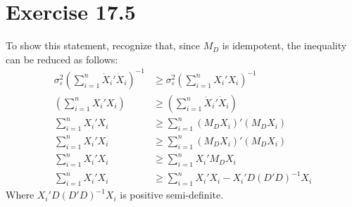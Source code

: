 \documentclass{article}
\newcommand{\eps}{\varepsilon}
\begin{document}

\section*{Exercise 17.5}
To show this statement, recognize that, since $M_D$ is idempotent, the inequality can be reduced as follows:
\begin{align*}
	\sigma^2_\eps\left(\sum_{i=1}^n\dot{X}_i'\dot{X}_i\right)^{-1}	&\geq \sigma^2_\eps\left(\sum_{i=1}^nX_i'X_i\right)^{-1}	\\
	\left(\sum_{i=1}^nX_i'X_i\right)								&\geq \left(\sum_{i=1}^n\dot{X}_i'\dot{X}_i\right)			\\
	\sum_{i=1}^nX_i'X_i												&\geq \sum_{i=1}^n(M_DX_i)'(M_DX_i)							\\
	\sum_{i=1}^nX_i'X_i												&\geq \sum_{i=1}^n(M_DX_i)'(M_DX_i)							\\
	\sum_{i=1}^nX_i'X_i												&\geq \sum_{i=1}^nX_i'M_DX_i								\\
	\sum_{i=1}^nX_i'X_i												&\geq \sum_{i=1}^nX_i'X_i - X_i'D(D'D)^{-1}X_i
\end{align*}
Where $X_i'D(D'D)^{-1}X_i$ is positive semi-definite.

\end{document}
